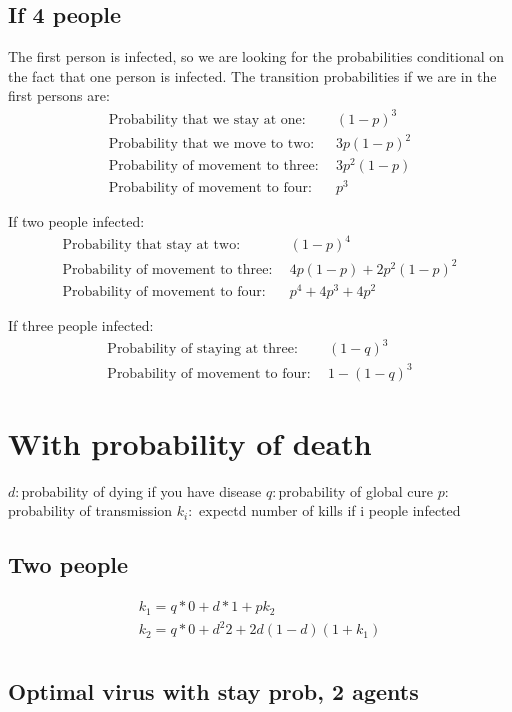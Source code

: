 \documentclass[12pt]{report}
\numberwithin{equation}{section}
\begin{document}
\subsection{If 4 people}

The first person is infected, so we are looking for the probabilities conditional on the fact that one person is infected. The transition probabilities if we are in the first persons are:
\begin{align}
\text{Probability that we stay at one:}& ~~(1-p)^3 \\
\text{Probability that we move to two:}& ~~3p(1-p)^2 \\
\text{Probability of movement to three:}& ~~3p^2(1-p) \\
\text{Probability of movement to four:}& ~~p^3
\end{align}

If two people infected:
\begin{align}
\text{Probability that stay at two:}&~~ (1-p)^4 \\
\text{Probability of movement to three:}& ~~4p(1-p)+2p^2(1-p)^2 \\
\text{Probability of movement to four:}& ~~p^4 + 4p^3+4p^2
\end{align}

If three people infected:
\begin{align}
\text{Probability of staying at three:}& ~~ (1-q)^3 \\
\text{Probability of movement to four:}& ~~1-(1-q)^3
\end{align}

\section{With probability of death}

$d: $probability of dying if you have disease
$q: $probability of global cure
$p: $probability of transmission
$k_i:$ expectd number of kills if i people infected 

\subsection{Two people}

\begin{align*}
k_1 = q*0+d*1+pk_2 \\
k_2 = q*0+d^2 2 + 2d(1-d)(1+k_1) \\
\end{align*}

\subsection{Optimal virus with stay prob, 2 agents}
\end{document}
